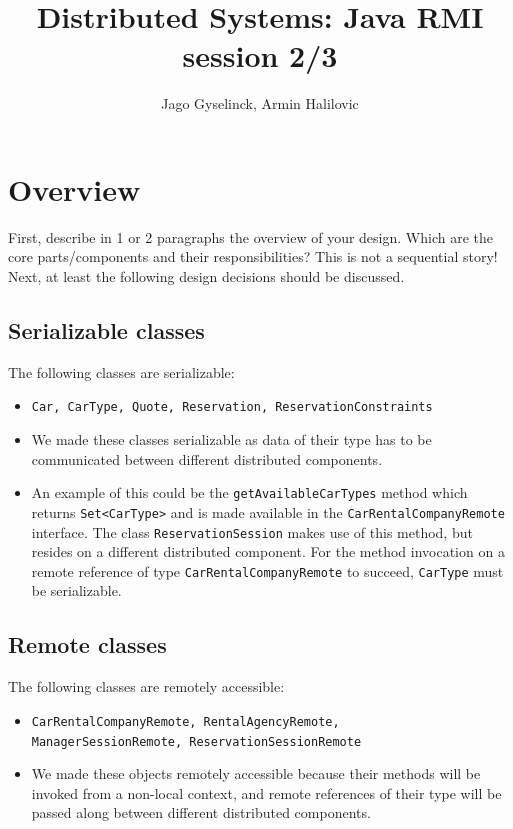 \documentclass{scrartcl}
\title{Distributed Systems: Java RMI session 2/3}
\author{Jago Gyselinck, Armin Halilovic}
\begin{document}
	\maketitle

	\section{Overview}
	First, describe in 1 or 2 paragraphs the overview of your design. Which are the core
    parts/components and their responsibilities? This is not a sequential story! Next, at least the
    following design decisions should be discussed. \\


    \subsection{Serializable classes}
    The following classes are serializable: 
    \begin{itemize}
		\item \texttt{Car, CarType, Quote, Reservation, ReservationConstraints}
		\item We made these classes serializable as data of their type has to be
		communicated between different distributed components. 
		\item An example of this could be the \texttt{getAvailableCarTypes} method which returns \texttt{Set<CarType>} and is made available in the \texttt{CarRentalCompanyRemote} interface. 
		The class \texttt{ReservationSession} makes use of this method, but resides on a different distributed component. For the method invocation on a remote reference of type \texttt{CarRentalCompanyRemote} to succeed, \texttt{CarType} must be serializable.
	\end{itemize}


    \subsection{Remote classes}
	The following classes are remotely accessible:
	\begin{itemize}
		\item \texttt{CarRentalCompanyRemote, RentalAgencyRemote,\\ ManagerSessionRemote, ReservationSessionRemote}
		\item We made these objects remotely accessible because their
		methods will be invoked from a non-local context, and remote references
		of their type will be passed along between different distributed components.
	\end{itemize}
	\newpage
\end{document}
